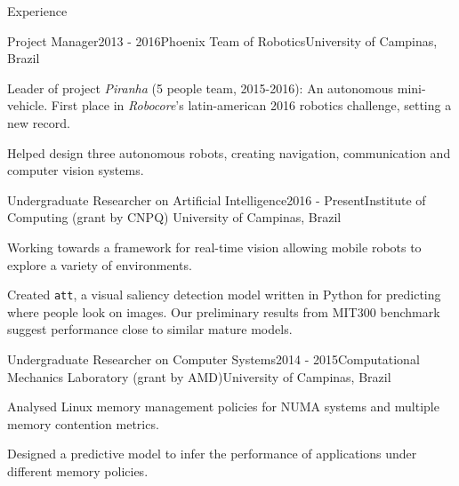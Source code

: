 \documentclass[8pt]{resume}
\newcommand{\tit}[1]{\textit{#1}}
\newcommand{\ttt}[1]{\texttt{#1}}
\begin{document}
\begin{rSection}{Experience}

\begin{rSubsection}{Project Manager}{2013 - 2016}{Phoenix Team of Robotics}{University of Campinas, Brazil}
    \item Leader of project \tit{Piranha} (5 people team, 2015-2016):
        An autonomous mini-vehicle.
        First place in \tit{Robocore}'s latin-american 2016 robotics challenge, setting a new record.
    \item Helped design three autonomous robots, creating navigation,
        communication and computer vision systems.
\end{rSubsection}

\begin{rSubsection}{Undergraduate Researcher on Artificial Intelligence}{2016 - Present}{Institute of Computing (grant by CNPQ)}
    {University of Campinas, Brazil}
    \item Working towards a framework for real-time vision
        allowing mobile robots to explore a variety of environments.
    \item Created \ttt{att}, a visual saliency detection model written in
        Python for predicting where people look on images.
        Our preliminary results from MIT300 benchmark suggest performance
        close to similar mature models.
\end{rSubsection}

\begin{rSubsection}{Undergraduate Researcher on Computer Systems}{2014 - 2015}{Computational Mechanics Laboratory (grant by AMD)}{University of Campinas, Brazil}
    \item Analysed Linux memory management policies for NUMA systems and multiple memory contention metrics.
    \item Designed a predictive model to infer the performance of applications under different memory policies.
\end{rSubsection}


\end{rSection}
\end{document}
